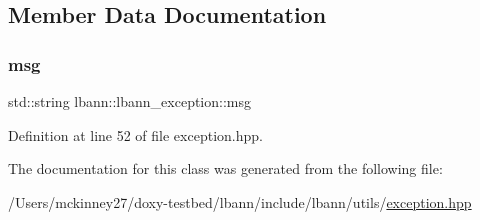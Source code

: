 \subsection{Member Data Documentation}
\mbox{\label{classlbann_1_1lbann__exception_a8698ff209b53c8452b5ca1d0caf7b824}} 
\subsubsection{\texorpdfstring{msg}{msg}}
{\footnotesize\ttfamily std\+::string lbann\+::lbann\+\_\+exception\+::msg\hspace{0.3cm}{\ttfamily [private]}}



Definition at line 52 of file exception.\+hpp.



The documentation for this class was generated from the following file\+:\begin{DoxyCompactItemize}
\item 
/\+Users/mckinney27/doxy-\/testbed/lbann/include/lbann/utils/\hyperlink{exception_8hpp}{exception.\+hpp}\end{DoxyCompactItemize}
